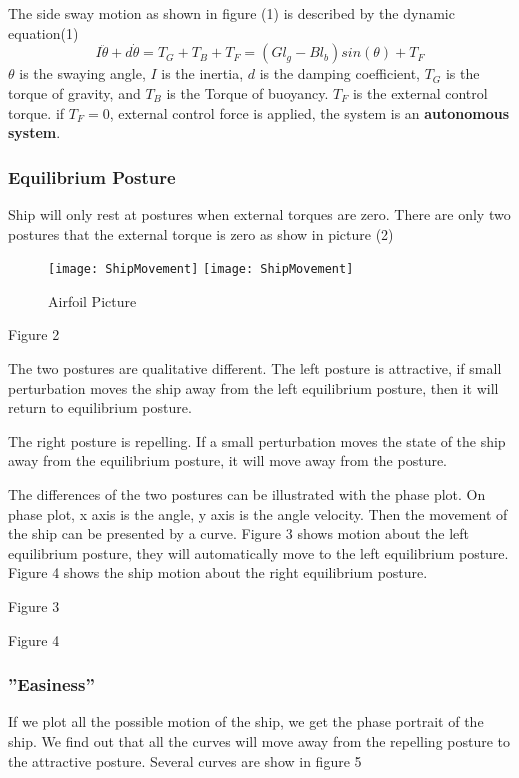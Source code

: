 The side sway motion as shown in figure (1) is described by the dynamic equation(1)
\begin{equation}
I \ddot{\theta}+d\dot{\theta}=T_{G}+T_{B}+T_{F}=(Gl_{g}-Bl_{b})sin(\theta)+T_{F}
\end{equation}
$\theta$ is the swaying angle,
$I$ is the inertia,  
$d$ is the damping coefficient,
$T_{G}$ is the torque of gravity, and $T_{B}$ is the Torque of buoyancy.
$T_{F}$ is the external control torque.
if $T_{F}=0$, external control force is applied, the system is an \textbf{autonomous system}.




\subsubsection*{Equilibrium Posture}
Ship will only rest at postures when external torques are zero.
There are only two postures that the external torque is zero as show in picture (2)
\begin{figure}[!htbp]
  \begin{center}
    \leavevmode
    \ifpdf
      \texttt{[image: ShipMovement]}
    \else
      \texttt{[image: ShipMovement]}
    \fi
    \caption{Airfoil Picture}
    \label{ShipEqulibrium}
  \end{center}
\end{figure}

Figure 2

The two postures are qualitative different.
The left posture is attractive, if small perturbation moves the ship away from the left equilibrium posture, then it will return to equilibrium posture.

The right posture is repelling.
If a small perturbation moves the state of the ship away from the equilibrium posture, it will move away from the posture.

The differences of the two postures can be illustrated with the phase plot.
On phase plot, x axis is the angle, y axis is the angle velocity. Then the movement of the ship can be presented by a curve.
Figure 3 shows motion about the left equilibrium posture, they will automatically move to the left equilibrium posture.
Figure 4 shows the ship motion about the right equilibrium posture.
 
Figure 3


Figure 4
\subsubsection*{''Easiness''}
If we plot all the possible motion of the ship, we get the phase portrait of the ship. We find out that all the curves will move away from the repelling posture to the attractive posture. Several curves are show in figure 5

